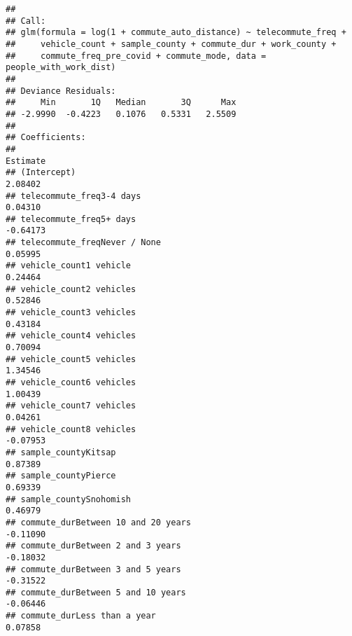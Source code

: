 \documentclass[
]{article}
\begin{document}
\begin{verbatim}
## 
## Call:
## glm(formula = log(1 + commute_auto_distance) ~ telecommute_freq + 
##     vehicle_count + sample_county + commute_dur + work_county + 
##     commute_freq_pre_covid + commute_mode, data = people_with_work_dist)
## 
## Deviance Residuals: 
##     Min       1Q   Median       3Q      Max  
## -2.9990  -0.4223   0.1076   0.5331   2.5509  
## 
## Coefficients:
##                                                                                             Estimate
## (Intercept)                                                                                  2.08402
## telecommute_freq3-4 days                                                                     0.04310
## telecommute_freq5+ days                                                                     -0.64173
## telecommute_freqNever / None                                                                 0.05995
## vehicle_count1 vehicle                                                                       0.24464
## vehicle_count2 vehicles                                                                      0.52846
## vehicle_count3 vehicles                                                                      0.43184
## vehicle_count4 vehicles                                                                      0.70094
## vehicle_count5 vehicles                                                                      1.34546
## vehicle_count6 vehicles                                                                      1.00439
## vehicle_count7 vehicles                                                                      0.04261
## vehicle_count8 vehicles                                                                     -0.07953
## sample_countyKitsap                                                                          0.87389
## sample_countyPierce                                                                          0.69339
## sample_countySnohomish                                                                       0.46979
## commute_durBetween 10 and 20 years                                                          -0.11090
## commute_durBetween 2 and 3 years                                                            -0.18032
## commute_durBetween 3 and 5 years                                                            -0.31522
## commute_durBetween 5 and 10 years                                                           -0.06446
## commute_durLess than a year                                                                  0.07858

\end{verbatim}
\end{document}
